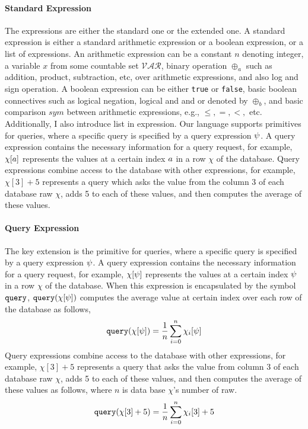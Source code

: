 \paragraph*{Standard Expression}
The expressions are either the standard one or the extended one.
A standard expression is
either a standard arithmetic expression or a boolean expression, or a list of expressions.
An arithmetic expression can be a constant $n$ denoting integer, a variable $x$ from some countable set $\mathcal{VAR}$, binary operation $\oplus_a$ such as addition, product, subtraction, etc, over arithmetic expressions, and also log and sign operation. 
%
A boolean expression can be either {\tt true} or {\tt false}, basic boolean connectives such as logical negation, logical and and or denoted by $\oplus_b$, and basic comparison $sym$ between arithmetic expressions, e.g., $\leq,=,<,$ etc.
Additionally, I also introduce list in expression.
Our language supports primitives for queries, 
where a specific query is specified by a query expression $\psi$. 
A query expression contains the necessary information for a query request, for example, 
$\chi[a]$ represents the values at a certain index $a$ in a row $\chi$ of the database. 
Query expressions combine access to the database with other expressions, 
for example, $\chi[3] + 5$ represents a query which asks the value from the column 3 of each database raw $\chi$, adds 5 to each of these values, 
and then computes the average of these values.
\paragraph*{Query Expression}
The key extension is
the primitive for queries, where a specific query is specified by a query expression $\psi$. 
A query expression contains the necessary information for a query request, 
for example, $\chi[\psi]$ represents the values at a certain index $\psi$ in a row $\chi$ of the database. 
When this expression is encapsulated by the symbol ${\tt query}$,
 $ {\tt query}(\chi[\psi]) $ computes the average value at certain index over each row of the database as follows,
 \[
  {\tt query}(\chi[\psi]) = \frac{1}{n}\sum\limits_{i = 0}^{n}\chi_i[\psi]
  \]
Query expressions combine access to the database with other expressions, 
for example, 
$\chi[3] + 5$ represents a query that asks the value from column 3 of each database raw $\chi$, 
adds 5 to each of these values, and then computes the average of these values as follows, where $n$ is 
data base $\chi$'s number of raw.
%
\[
  {\tt query}(\chi[3] + 5) = \frac{1}{n}\sum\limits_{i = 0}^{n}\chi_i[3] + 5
  \]


